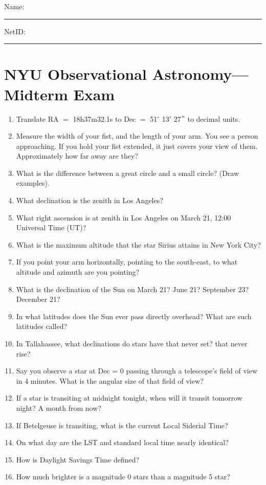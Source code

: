 \documentclass[12pt]{article}
\begin{document}
\noindent
Name: \rule[-1ex]{0.55\textwidth}{0.1pt}
NetID: \rule[-1ex]{0.2\textwidth}{0.1pt}

\section*{NYU Observational Astronomy---Midterm Exam}

\begin{enumerate}
\item Translate RA $=$ 18h37m32.1s to Dec $=$ 51$^\circ$ 13$'$ 27$"$
  to decimal units.
\item Measure the width of your fist, and the length of your arm. You
  see a person approaching. If you hold your fist extended, it just
  covers your view of them.  Approximately how far away are they?
\item What is the difference between a great circle and a small
  circle? (Draw examples).
\item What declination is the zenith in Los Angeles?
\item What right ascension is at zenith in Los Angeles on March 21,
  12:00 Universal Time (UT)?
\item What is the maximum altitude that the star Sirius attains in New
  York City?
\item If you point your arm horizontally, pointing to the south-east,
to what altitude and azimuth are you pointing?
\item  What is the declination of the Sun on March 21? June 21?
  September 23? December 21?
\item In what latitudes does the Sun ever pass directly overhead? What
  are such latitudes called?
\item In Tallahassee, what declinations do stars have that never set?
  that never rise?
\item Say you observe a star at Dec = 0 passing through a telescope's
  field of view in 4 minutes. What is the angular size of that field
  of view?
\item If a star is transiting at midnight tonight, when will it
  transit tomorrow night? A month from now?
\item If Betelgeuse is transiting, what is the current Local Siderial
  Time?
\item On what day are the LST and standard local time nearly
  identical?
\item How is Daylight Savings Time defined?
\item How much brighter is a magnitude 0 stars than a magnitude 5 star?

\end{enumerate}
\end{document}
